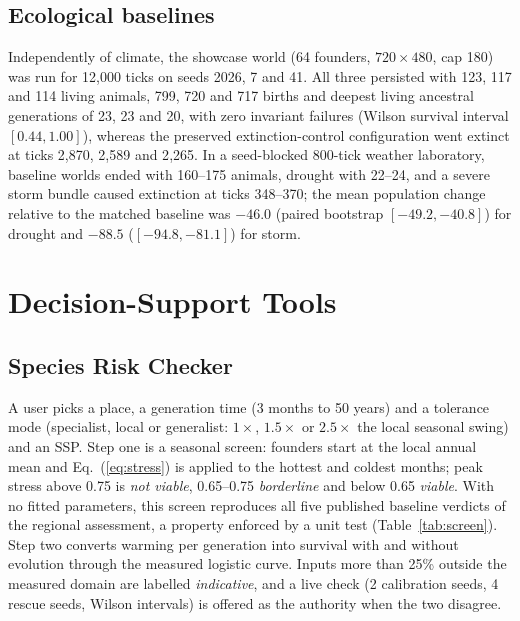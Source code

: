 \documentclass[conference]{IEEEtran}
\begin{document}
\subsection{Ecological baselines}
Independently of climate, the showcase world (64 founders, $720\times480$, cap 180)
was run for 12{,}000 ticks on seeds 2026, 7 and 41. All three persisted with
123, 117 and 114 living animals, 799, 720 and 717 births and deepest living
ancestral generations of 23, 23 and 20, with zero invariant failures (Wilson
survival interval $[0.44,1.00]$), whereas the preserved extinction-control
configuration went extinct at ticks 2{,}870, 2{,}589 and 2{,}265. In a seed-blocked
800-tick weather laboratory, baseline worlds ended with 160--175 animals, drought
with 22--24, and a severe storm bundle caused extinction at ticks 348--370;
the mean population change relative to the matched baseline was $-46.0$ (paired
bootstrap $[-49.2,-40.8]$) for drought and $-88.5$ ($[-94.8,-81.1]$) for storm.

\section{Decision-Support Tools}
\label{sec:tools}
\subsection{Species Risk Checker}
A user picks a place, a generation time (3 months to 50 years) and a tolerance
mode (specialist, local or generalist: $1\times$, $1.5\times$ or $2.5\times$ the
local seasonal swing) and an SSP. Step one is a seasonal screen: founders start at
the local annual mean and Eq.~(\ref{eq:stress}) is applied to the hottest and
coldest months; peak stress above 0.75 is \emph{not viable}, 0.65--0.75
\emph{borderline} and below 0.65 \emph{viable}. With no fitted parameters, this
screen reproduces all five published baseline verdicts of the regional assessment,
a property enforced by a unit test (Table~\ref{tab:screen}). Step two converts warming per generation into
survival with and without evolution through the measured logistic curve. Inputs
more than 25\% outside the measured domain are labelled \emph{indicative}, and a
live check (2 calibration seeds, 4 rescue seeds, Wilson intervals) is offered as
the authority when the two disagree.
\end{document}
